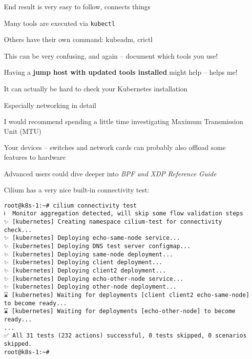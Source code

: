\documentclass[Screen16to9,17pt]{foils}
\begin{document}
\begin{list2}
\item End result is very easy to follow, connects things
\end{list2}

{}


\begin{list2}
\item Many tools are executed via \verb+kubectl+
\item Others have their own command: kubeadm, crictl
\item This can be very confusing, and again -- document which tools you use!
\item Having a {\bf jump host with updated tools installed} might help -- helps me!
\end{list2}





\begin{list2}
\item It can actually be hard to check your Kubernetes installation
\item Especially networking in detail
\item I would recommend spending a little time investigating Maximum Transmission Unit (MTU)\\
\item Your devices -- switches and network cards can probably also offload some features to hardware
\item Advanced users could dive deeper into \emph{BPF and XDP Reference Guide} 
\end{list2}



Cilium has a very nice built-in connectivity test:
\begin{verbatim}
root@k8s-1:~# cilium connectivity test
ℹ️  Monitor aggregation detected, will skip some flow validation steps
✨ [kubernetes] Creating namespace cilium-test for connectivity check...
✨ [kubernetes] Deploying echo-same-node service...
✨ [kubernetes] Deploying DNS test server configmap...
✨ [kubernetes] Deploying same-node deployment...
✨ [kubernetes] Deploying client deployment...
✨ [kubernetes] Deploying client2 deployment...
✨ [kubernetes] Deploying echo-other-node service...
✨ [kubernetes] Deploying other-node deployment...
⌛ [kubernetes] Waiting for deployments [client client2 echo-same-node] to become ready...
⌛ [kubernetes] Waiting for deployments [echo-other-node] to become ready...
...
✅ All 31 tests (232 actions) successful, 0 tests skipped, 0 scenarios skipped.
root@k8s-1:~#
\end{verbatim}
\end{document}
